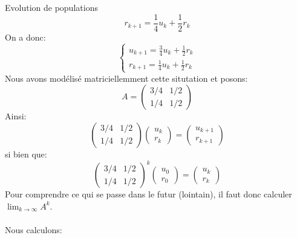 \begin{parag}{Evolution de populations}
    \[r_{k+1} = \frac{1}{4}u_k + \frac{1}{2}r_k\]
    On a donc:
    \[\begin{cases}
        u_{k+1} = \frac{3}{4}u_k + \frac{1}{2}r_k\\
        r_{k+1} = \frac{1}{4}u_k + \frac{1}{2}r_k
    \end{cases}\]
    Nous avons modélisé matriciellemment cette situtation et posons:
\[A = \begin{pmatrix}
    3/4 & 1/2\\ 1/4 & 1/2
\end{pmatrix}\]
Ainsi:
\[\begin{pmatrix}
    3/4 & 1/2\\ 1/4 & 1/2
\end{pmatrix}\begin{pmatrix}
    u_k \\ r_k
\end{pmatrix} = \begin{pmatrix}
    u_{k+1}\\ r_{k+1}
\end{pmatrix}\]
si bien que:
\[\begin{pmatrix}
    3/4 & 1/2\\ 1/4 & 1/2
\end{pmatrix}^k\begin{pmatrix}
    u_0\\r_0
\end{pmatrix} = \begin{pmatrix}
    u_k \\ r_k
\end{pmatrix}\]
Pour comprendre ce qui se passe dans le futur (lointain), il faut donc calculer $\lim_{k \to \infty} A^k$.
\\
\\
Nous calculons:
\end{parag}
